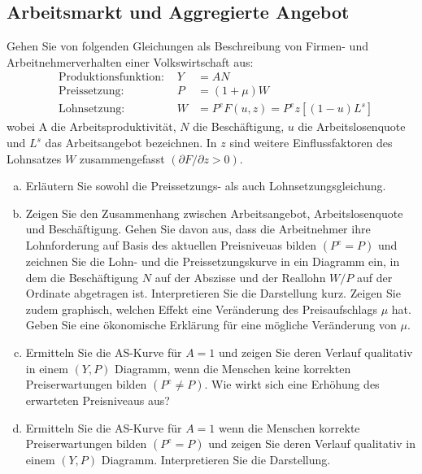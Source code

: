 \documentclass{scrartcl}
\begin{document}
\subsection{Arbeitsmarkt und Aggregierte Angebot}
Gehen Sie von folgenden Gleichungen als Beschreibung von Firmen- und Arbeitnehmerverhalten einer Volkswirtschaft aus:
\begin{align}
  &\text{Produktionsfunktion: }& Y &= AN\\
  &\text{Preissetzung: }& P &= (1+\mu)W\\
  &\text{Lohnsetzung: }& W &=P^e F(u,z)=P^e z[(1-u)L^s]
\end{align}
wobei A die Arbeitsproduktivit\"{a}t, $N$ die Besch\"{a}ftigung, $u$ die Arbeitslosenquote und $L^s$ das Arbeitsangebot bezeichnen. In $z$ sind weitere Einflussfaktoren des Lohnsatzes $W$ zusammengefasst $(\partial F/\partial z >0)$.
\begin{enumerate}[(a)]
\item Erl\"{a}utern Sie sowohl die Preissetzungs- als auch Lohnsetzungsgleichung.
\item Zeigen Sie den Zusammenhang zwischen Arbeitsangebot, Arbeitslosenquote und Besch\"{a}ftigung. Gehen Sie davon aus, dass die Arbeitnehmer ihre Lohnforderung auf Basis des aktuellen Preisniveuas bilden $(P^e=P)$ und zeichnen Sie die Lohn- und die Preissetzungskurve in ein Diagramm ein, in dem die Besch\"{a}ftigung $N$ auf der Abszisse und der Reallohn $W/P$ auf der Ordinate abgetragen ist. Interpretieren Sie die Darstellung kurz. Zeigen Sie zudem graphisch, welchen Effekt eine Ver\"{a}nderung des Preisaufschlags $\mu$ hat. Geben Sie eine \"{o}konomische Erkl\"{a}rung f\"{u}r eine m\"{o}gliche Ver\"{a}nderung von $\mu$.
\item Ermitteln Sie die AS-Kurve f\"{u}r $A = 1$ und zeigen Sie deren Verlauf qualitativ in einem $(Y,P)$ Diagramm, wenn die Menschen keine korrekten Preiserwartungen bilden $(P^e\neq P)$. Wie wirkt sich eine Erh\"{o}hung des erwarteten Preisniveaus aus?
\item Ermitteln Sie die AS-Kurve f\"{u}r $A = 1$ wenn die Menschen korrekte Preiserwartungen bilden $(P^e=P)$ und zeigen Sie deren Verlauf qualitativ in einem $(Y,P)$ Diagramm. Interpretieren Sie die Darstellung.
\end{enumerate}
\end{document}
